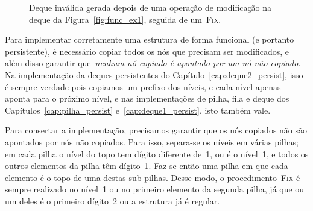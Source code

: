 \documentclass[../../main.tex]{subfiles}
\begin{document}
\begin{figure}[h]
\centering
{}
\caption{Deque inválida gerada depois de uma operação de modificação na deque da Figura~\ref{fig:func_ex1}, seguida de um~\textsc{Fix}.} \label{fig:func_ex1res}
\end{figure}


Para implementar corretamente uma estrutura de forma funcional (e portanto persistente), é necessário copiar todos os nós que precisam ser modificados, e além disso garantir que~\emph{nenhum nó copiado é apontado por um nó não copiado}. Na implementação da deques persistentes do Capítulo~\ref{cap:deque2_persist}, isso é sempre verdade pois copiamos um prefixo dos níveis, e cada nível apenas aponta para o próximo nível, e nas implementações de pilha, fila e deque dos Capítulos~\ref{cap:pilha_persist} e~\ref{cap:deque1_persist}, isto também vale.

Para consertar a implementação, precisamos garantir que os nós copiados não são apontados por nós não copiados. Para isso, separa-se os níveis em várias pilhas; em cada pilha o nível do topo tem dígito diferente de~1, ou é o nível~1, e todos os outros elementos da pilha têm dígito~1. Faz-se então uma pilha em que cada elemento é o topo de uma destas sub-pilhas. Desse modo, o procedimento~\textsc{Fix} é sempre realizado no nível~1 ou no primeiro elemento da segunda pilha, já que ou um deles é o primeiro dígito~2 ou a estrutura já é regular.
\end{document}
